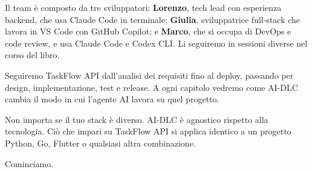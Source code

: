 Il team è composto da tre sviluppatori: \textbf{Lorenzo}, tech lead con esperienza backend, che usa Claude Code in terminale; \textbf{Giulia}, sviluppatrice full-stack che lavora in VS Code con GitHub Copilot; e \textbf{Marco}, che si occupa di DevOps e code review, e usa Claude Code e Codex CLI. Li seguiremo in sessioni diverse nel corso del libro.

Seguiremo TaskFlow API dall'analisi dei requisiti fino al deploy, passando per design, implementazione, test e release. A ogni capitolo vedremo come AI-DLC cambia il modo in cui l'agente AI lavora su quel progetto.

Non importa se il tuo stack è diverso. AI-DLC è agnostico rispetto alla tecnologia. Ciò che impari su TaskFlow API si applica identico a un progetto Python, Go, Flutter o qualsiasi altra combinazione.

\bigskip
Cominciamo.

